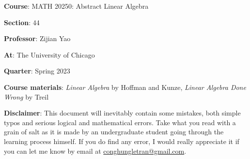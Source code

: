 \textbf{Course}: MATH 20250: Abstract Linear Algebra

\textbf{Section}: 44

\textbf{Professor}: Zijian Yao

\textbf{At}: The University of Chicago

\textbf{Quarter}: Spring 2023

\textbf{Course materials}: \textit{Linear Algebra} by Hoffman and Kunze, \textit{Linear Algebra Done Wrong} by Treil

\vspace{1cm}
\textbf{Disclaimer}: This document will inevitably contain some mistakes, both simple typos and serious logical and mathematical errors. Take what you read with a grain of salt as it is made by an undergraduate student going through the learning process himself. If you do find any error, I would really appreciate it if you can let me know by email at \href{mailto:conghungletran@gmail.com}{conghungletran@gmail.com}.